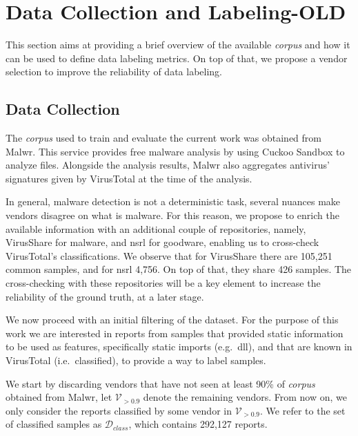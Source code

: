 \color{red}

\section{Data Collection and Labeling-OLD}\label{sec:data_collection}

This section aims at providing a brief overview of the available \textit{corpus} and how it can be used to define data labeling metrics. On top of that, we propose a vendor selection to improve the reliability of data labeling.

\subsection{Data Collection}

The \textit{corpus} used to train and evaluate the current work was obtained from Malwr\cite{tool:malwr}. This service provides free malware analysis by using Cuckoo Sandbox\cite{tool:cuckoo} to analyze files. Alongside the analysis results, Malwr also aggregates antivirus' signatures given by VirusTotal\cite{tool:virustotal} at the time of the analysis.


In general, malware detection is not a deterministic task, several nuances make vendors disagree on what is malware. For this reason, we propose to enrich the available information with an additional couple of repositories, namely, VirusShare\cite{tool:virusshare} for malware, and \gls{nsrl}\cite{tool:nsrl} for goodware, enabling us to cross-check VirusTotal's classifications. We observe that for VirusShare there are 105,251 common samples, and for \gls{nsrl} 4,756. On top of that, they share 426 samples. The cross-checking with these repositories will be a key element to increase the reliability of the ground truth, at a later stage.

We now proceed with an initial filtering of the dataset. For the purpose of this work we are interested in reports from samples that provided static information to be used as features, specifically static imports (e.g.\ \gls{dll}), and that are known in VirusTotal (i.e.\ classified), to provide a way to label samples.

We start by discarding vendors that have not seen at least 90\% of \textit{corpus} obtained from Malwr, let $\mathcal{V}_{>0.9}$ denote the remaining vendors. From now on, we only consider the reports classified by some vendor in $\mathcal{V}_{>0.9}$. We refer to the set of classified samples as $\mathcal{D}_{class}$, which contains 292,127 reports.

